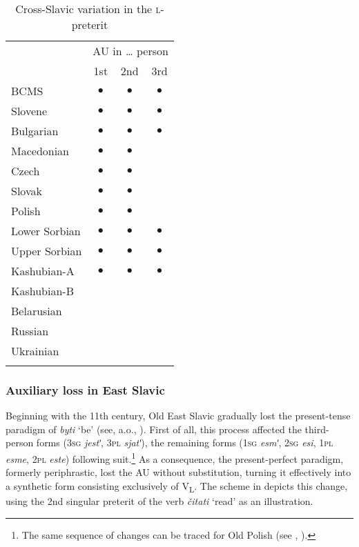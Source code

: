 \documentclass[output=paper]{langscibook}
\begin{document}
\begin{table}
\begin{tabular}{lccc}
\lsptoprule
& \multicolumn{3}{c}{AU in {\dots} person} \\
& 1st & 2nd & 3rd \\
\midrule
BCMS & $\bullet$ & $\bullet$ & $\bullet$ \\ 
Slovene & $\bullet$ & $\bullet$ & $\bullet$ \\
Bulgarian & $\bullet$ & $\bullet$ & $\bullet$ \\ 
Macedonian & $\bullet$ & $\bullet$ & \\\addlinespace
Czech & $\bullet$ & $\bullet$ & \\
Slovak & $\bullet$ & $\bullet$ & \\
Polish & $\bullet$ & $\bullet$ & \\
Lower Sorbian & $\bullet$ & $\bullet$ & $\bullet$ \\
Upper Sorbian & $\bullet$ & $\bullet$ & $\bullet$ \\
Kashubian-A & $\bullet$ & $\bullet$ & $\bullet$ \\ 
Kashubian-B & & & \\\addlinespace
Belarusian & & & \\
Russian & & & \\
Ukrainian & & & \\
\lspbottomrule
\end{tabular}
\caption{Cross-Slavic variation in the \textsc{l-}preterit}
\label{pitsch:tab:perfect_overview}
\end{table}


\subsubsection{Auxiliary loss in East Slavic}\label{pitsch:sec:EastSlavic}

Beginning with the 11th century, Old East Slavic gradually lost the present-tense paradigm of \textit{byti} `be' (see, a.o., \cites{Issatchenko1940}[391]{Ivanov1964}[298]{BorkovskijKuznecov1965}{Sokolova2017}). First of all, this process affected the third-person forms (\textsc{3sg} \textit{jestʹ}, \textsc{3pl} \textit{sjatʹ}), the remaining forms (\textsc{1sg} \textit{esmʹ}, \textsc{2sg} \textit{esi}, \textsc{1pl} \textit{esme}, \textsc{2pl} \textit{este}) following suit.\footnote{The same sequence of changes can be traced for Old Polish (see \citealt[127--128]{Decaux1955}, \citealt[41]{Migdalski2006}).} As a consequence, the present-perfect paradigm, formerly periphrastic, lost the AU without substitution, turning it effectively into a synthetic form consisting exclusively of V\textsubscript{L}. The scheme in  depicts this change, using the 2nd singular preterit of the verb \textit{čitati} `read' as an illustration.\largerpage[-2]
\end{document}
